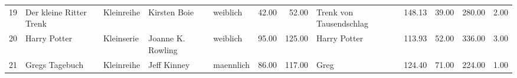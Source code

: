 \begin{table}
\begin{center}
{\begin{tabular}{rllllrrlrrrr}
  19 & Der kleine Ritter Trenk                                                                                                                                                                                                                                         & Kleinreihe & Kirsten Boie                                                                                                                                                                                                                                                    & weiblich & 42.00 & 52.00 & Trenk von Tausendschlag                                                                                                                                                                                                                                         & 148.13 & 39.00 & 280.00 & 2.00 \\ 
  20 & Harry Potter                                                                                                                                                                                                                                                    & Kleinserie & Joanne K. Rowling                                                                                                                                                                                                                                               & weiblich & 95.00 & 125.00 & Harry Potter                                                                                                                                                                                                                                                    & 113.93 & 52.00 & 336.00 & 3.00 \\ 
  21 & Gregs Tagebuch                                                                                                                                                                                                                                                  & Kleinreihe & Jeff Kinney                                                                                                                                                                                                                                                     & maennlich & 86.00 & 117.00 & Greg                                                                                                                                                                                                                                                            & 124.40 & 71.00 & 224.00 & 1.00 \\ 

\end{tabular}}
\end{center}
\end{table}
